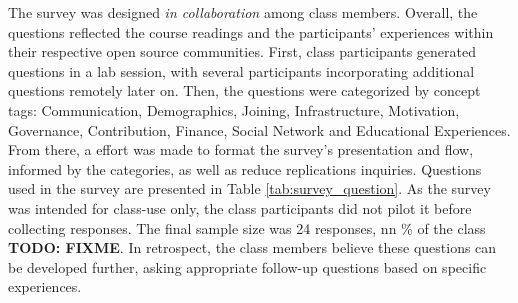 The survey was designed {\it in collaboration} among class members. Overall, the questions reflected the course 
readings and the participants' experiences within their respective open source communities. First, class 
participants generated questions in a lab session, with several participants incorporating additional questions remotely later on. 
Then, the questions were categorized by concept tags: Communication, Demographics, Joining, Infrastructure, Motivation,
Governance, Contribution, Finance, Social Network and Educational Experiences. From there, a effort was made to format the survey's 
presentation and flow, informed by the categories, as well as reduce replications inquiries. Questions used in the survey 
are presented in Table \ref{tab:survey_question}. As the survey was intended for class-use only, the class participants did not pilot it before collecting 
responses. The final sample size was 24 responses, nn \% of the class \textbf{TODO: FIXME}. In retrospect, the class members believe these questions can be 
developed further, asking appropriate follow-up questions based on specific experiences.

